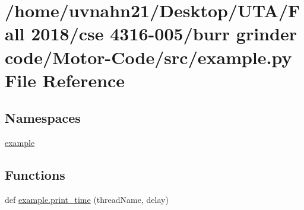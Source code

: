 \hypertarget{Motor-Code_2src_2example_8py}{}\section{/home/uvnahn21/\+Desktop/\+U\+T\+A/\+Fall 2018/cse 4316-\/005/burr grinder code/\+Motor-\/\+Code/src/example.py File Reference}
\label{Motor-Code_2src_2example_8py}
\subsection*{Namespaces}
\begin{DoxyCompactItemize}
\item 
 \hyperlink{namespaceexample}{example}
\end{DoxyCompactItemize}
\subsection*{Functions}
\begin{DoxyCompactItemize}
\item 
def \hyperlink{namespaceexample_aec155d069ed4316665153c31d6a428bc}{example.\+print\+\_\+time} (thread\+Name, delay)
\end{DoxyCompactItemize}
